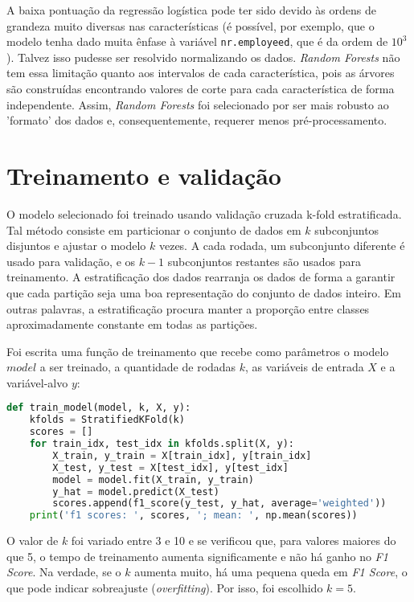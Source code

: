 \documentclass[12pt]{article}
\begin{document}
A baixa pontuação da regressão logística pode ter sido devido às ordens de grandeza muito diversas nas características (é possível, por exemplo, que o modelo tenha dado muita ênfase à variável \texttt{nr.employeed}, que é da ordem de $10^{3}$). Talvez isso pudesse ser resolvido normalizando os dados. \emph{Random Forests} não tem essa limitação quanto aos intervalos de cada característica, pois as árvores são construídas encontrando valores de corte para cada característica de forma independente. Assim, \emph{Random Forests} foi selecionado por ser mais robusto ao 'formato' dos dados e, consequentemente, requerer menos pré-processamento.

\section{Treinamento e validação}

O modelo selecionado foi treinado usando validação cruzada k-fold estratificada. Tal método consiste em particionar o conjunto de dados em $k$ subconjuntos disjuntos e ajustar o modelo $k$ vezes. A cada rodada, um subconjunto diferente é usado para validação, e os $k-1$ subconjuntos restantes são usados para treinamento. A estratificação dos dados rearranja os dados de forma a garantir que cada partição seja uma boa representação do conjunto de dados inteiro. Em outras palavras, a estratificação procura manter a proporção entre classes aproximadamente constante em todas as partições.

Foi escrita uma função de treinamento que recebe como parâmetros o modelo $model$ a ser treinado, a quantidade de rodadas $k$, as variáveis de entrada $X$ e a variável-alvo $y$:

\begin{lstlisting}[language=Python]
def train_model(model, k, X, y):
	kfolds = StratifiedKFold(k)
	scores = []
	for train_idx, test_idx in kfolds.split(X, y):
	    X_train, y_train = X[train_idx], y[train_idx]
	    X_test, y_test = X[test_idx], y[test_idx]
	    model = model.fit(X_train, y_train)
	    y_hat = model.predict(X_test)
	    scores.append(f1_score(y_test, y_hat, average='weighted'))
	print('f1 scores: ', scores, '; mean: ', np.mean(scores))
\end{lstlisting}

O valor de $k$ foi variado entre 3 e 10 e se verificou que, para valores maiores do que 5, o tempo de treinamento aumenta significamente e não há ganho no \emph{F1 Score}. Na verdade, se o $k$ aumenta muito, há uma pequena queda em \emph{F1 Score}, o que pode indicar sobreajuste (\emph{overfitting}).  Por isso, foi escolhido $k=5$.
\end{document}

